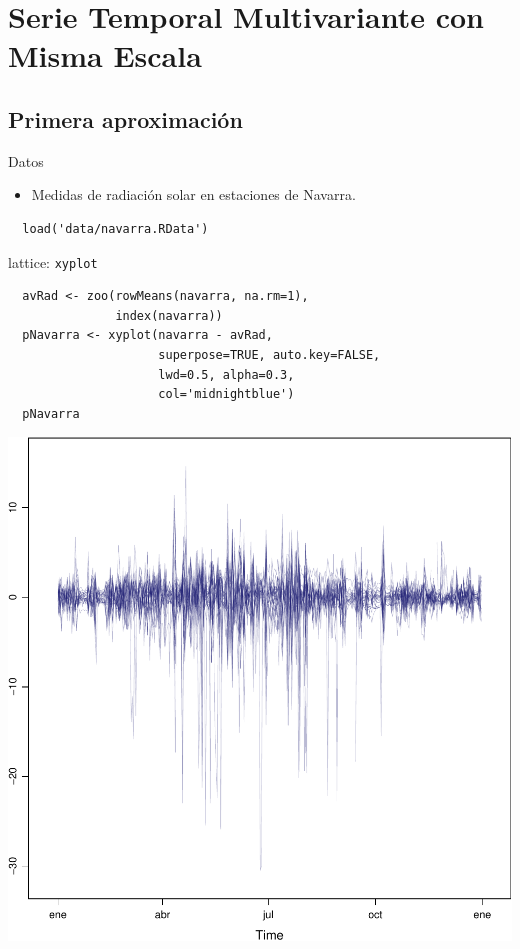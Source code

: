 \documentclass[xcolor={usenames,svgnames,dvipsnames}]{beamer}
\begin{document}
\section{Serie Temporal Multivariante con Misma Escala}
\label{sec-3}

\subsection{Primera aproximación}
\label{sec-3-1}
\begin{frame}[fragile,label=sec-3-1-1]{Datos}
 \begin{itemize}
\item Medidas de radiación solar en estaciones de Navarra.
\end{itemize}
\lstset{language=R,label= ,caption= ,numbers=none}
\begin{lstlisting}
  load('data/navarra.RData')
\end{lstlisting}
\end{frame}


\begin{frame}[fragile,label=sec-3-1-2]{lattice: \texttt{xyplot}}
 \lstset{language=R,label= ,caption= ,numbers=none}
\begin{lstlisting}
  avRad <- zoo(rowMeans(navarra, na.rm=1),
               index(navarra))
  pNavarra <- xyplot(navarra - avRad,
                     superpose=TRUE, auto.key=FALSE,
                     lwd=0.5, alpha=0.3,
                     col='midnightblue') 
  pNavarra
\end{lstlisting}
\end{frame}

\begin{frame}[label=sec-3-1-3]{}
\includegraphics[width=.9\linewidth]{figs/navarra.pdf}
\end{frame}
\end{document}
